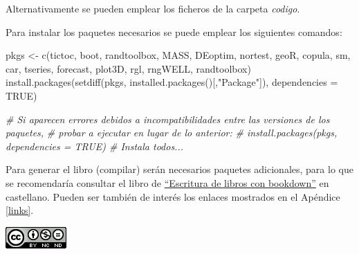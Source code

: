 \documentclass[
]{book}
\newenvironment{Shaded}{\begin{snugshade}}{\end{snugshade}}
\newcommand{\AttributeTok}[1]{\textcolor[rgb]{0.77,0.63,0.00}{#1}}
\newcommand{\CommentTok}[1]{\textcolor[rgb]{0.56,0.35,0.01}{\textit{#1}}}
\newcommand{\ConstantTok}[1]{\textcolor[rgb]{0.00,0.00,0.00}{#1}}
\newcommand{\FunctionTok}[1]{\textcolor[rgb]{0.00,0.00,0.00}{#1}}
\newcommand{\NormalTok}[1]{#1}
\newcommand{\OtherTok}[1]{\textcolor[rgb]{0.56,0.35,0.01}{#1}}
\newcommand{\StringTok}[1]{\textcolor[rgb]{0.31,0.60,0.02}{#1}}
\theoremstyle{break}
\theoremstyle{nonumberplain}
\begin{document}
Alternativamente se pueden emplear los ficheros de la carpeta \emph{codigo}.

Para instalar los paquetes necesarios se puede emplear los siguientes comandos:

\begin{Shaded}
\begin{Highlighting}[]
\NormalTok{pkgs }\OtherTok{\textless{}{-}} \FunctionTok{c}\NormalTok{(}\StringTok{\textquotesingle{}tictoc\textquotesingle{}}\NormalTok{, }\StringTok{\textquotesingle{}boot\textquotesingle{}}\NormalTok{, }\StringTok{\textquotesingle{}randtoolbox\textquotesingle{}}\NormalTok{, }\StringTok{\textquotesingle{}MASS\textquotesingle{}}\NormalTok{, }\StringTok{\textquotesingle{}DEoptim\textquotesingle{}}\NormalTok{, }\StringTok{\textquotesingle{}nortest\textquotesingle{}}\NormalTok{, }\StringTok{\textquotesingle{}geoR\textquotesingle{}}\NormalTok{, }\StringTok{\textquotesingle{}copula\textquotesingle{}}\NormalTok{,}
          \StringTok{\textquotesingle{}sm\textquotesingle{}}\NormalTok{, }\StringTok{\textquotesingle{}car\textquotesingle{}}\NormalTok{, }\StringTok{\textquotesingle{}tseries\textquotesingle{}}\NormalTok{, }\StringTok{\textquotesingle{}forecast\textquotesingle{}}\NormalTok{, }\StringTok{\textquotesingle{}plot3D\textquotesingle{}}\NormalTok{, }\StringTok{\textquotesingle{}rgl\textquotesingle{}}\NormalTok{, }\StringTok{\textquotesingle{}rngWELL\textquotesingle{}}\NormalTok{, }\StringTok{\textquotesingle{}randtoolbox\textquotesingle{}}\NormalTok{)}
\FunctionTok{install.packages}\NormalTok{(}\FunctionTok{setdiff}\NormalTok{(pkgs, }\FunctionTok{installed.packages}\NormalTok{()[,}\StringTok{"Package"}\NormalTok{]), }
                 \AttributeTok{dependencies =} \ConstantTok{TRUE}\NormalTok{)}

\CommentTok{\# Si aparecen errores debidos a incompatibilidades entre las versiones de los paquetes, }
\CommentTok{\# probar a ejecutar en lugar de lo anterior:}
\CommentTok{\# install.packages(pkgs, dependencies = TRUE) \# Instala todos...}
\end{Highlighting}
\end{Shaded}

Para generar el libro (compilar) serán necesarios paquetes adicionales,
para lo que se recomendaría consultar el libro de \href{https://rubenfcasal.github.io/bookdown_intro}{``Escritura de libros con bookdown''} en castellano.
Pueden ser también de interés los enlaces mostrados en el Apéndice \ref{links}.

\begin{flushleft}\includegraphics[width=0.1\linewidth]{images/by-nc-nd-88x31} \end{flushleft}
\end{document}
